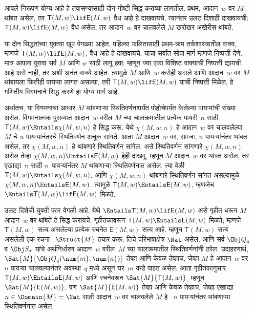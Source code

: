 \begin{explain}
आपले निरूपण योग्य आहे हे तपासण्यासाठी दोन
गोष्टी सिद्ध कराव्या लागतील. प्रथम,
आदान~$w$ वर $M$ थांबत असेल, तर
$\mathsf{T}(M, w) \lif \mathsf{E}(M, w)$ वैध आहे
हे दाखवायचे. त्यानंतर उलट दिशाही
दाखवायची: $\mathsf{T}(M, w) \lif \mathsf{E}(M, w)$
वैध असेल, तर आदान~$w$ वर
चालवलेले $M$ खरोखर अखेरीस
थांबते.

या दोन सिद्धतांच्या युक्त्या खूप
वेगळ्या आहेत. पहिल्या फलितासाठी
प्रथम-क्रम तर्कशास्त्रातील
वाक्य, म्हणजे
$\mathsf{T}(M, w) \lif \mathsf{E}(M, w)$,
वैध आहे हे दाखवायचे. याचा
सर्वांत सोपा मार्ग म्हणजे
निष्पत्ती देणे.
मात्र आपला पुरावा सर्व $M$
आणि $w$ साठी लागू हवा;
म्हणून ज्या एका विशिष्ट
वाक्याची
निष्पत्ती
द्यायची आहे असे नाही,
तर अशी अनंत वाक्ये आहेत.
त्यामुळे $M$ आणि~$w$
कसेही असले आणि आदान~$w$
वर $M$ थांबायला कितीही
पायऱ्या लागत असल्या,
तरी $\mathsf{T}(M, w) \lif \mathsf{E}(M, w)$
याची निष्पत्ती
मिळेल, हे गणितीय विगमनाने
सिद्ध करणे हा योग्य मार्ग आहे.

अर्थातच, या विगमनाचा आधार
$M$ थांबणाऱ्या स्थितिवर्णनापर्यंत
पोहोचेपर्यंत केलेल्या पायऱ्यांची
संख्या असेल. विगमनात्मक पुराव्यात
आदान~$w$ वरील $M$ च्या
चालक्रमातील प्रत्येक पायरी~$n$
साठी $\mathsf{T}(M, w) \Entails \chi(M, w, n)$
हे सिद्ध करू. येथे $\chi(M, w, n)$
हे आदान~$w$ वर चालवलेल्या~$M$
चे $n$ पायऱ्यांनंतरचे स्थितिवर्णन
अचूक सांगते. आता $M$ आदान~$w$
वर, समजा, $n$ पायऱ्यांनंतर
थांबत असेल, तर $\chi(M, w, n)$
हे थांबणारे स्थितिवर्णन सांगेल.
असे स्थितिवर्णन सांगणारे
$\chi(M, w, n)$ असेल तेव्हा
$\chi(M, w, n) \Entails \mathsf{E}(M, w)$
हेही दाखवू. म्हणून $M$
आदान~$w$ वर थांबत असेल,
तर एखाद्या~$n$ साठी
$n$~पायऱ्यांनंतर $M$
थांबणाऱ्या स्थितिवर्णनात असेल.
त्या वेळी $\mathsf{T}(M, w)
\Entails \chi(M, w, n)$,
आणि $\chi(M, w, n)$
थांबणारे स्थितिवर्णन सांगत
असल्यामुळे $\chi(M, w, n) \Entails \mathsf{E}(M, w)$.
त्यामुळे $\mathsf{T}(M, w) \Entails \mathsf{E}(M, w)$,
म्हणजेच $\Entails \mathsf{T}(M, w)
\lif \mathsf{E}(M, w)$ मिळते.

उलट दिशेची युक्ती फार वेगळी
आहे. येथे $\Entails \mathsf{T}(M, w) \lif \mathsf{E}(M, w)$
असे गृहीत धरून $M$ आदान~$w$
वर थांबते हे सिद्ध करायचे.
गृहीतकावरून $\mathsf{T}(M, w) \Entails \mathsf{E}(M,
w)$ मिळते; म्हणजे $\mathsf{T}(M,
w)$ सत्य असलेल्या प्रत्येक
रचनेत
$\mathsf{E}(M, w)$ सत्य आहे.
म्हणून $\mathsf{T}(M, w)$ सत्य
असलेली एक रचना
~$\Struct{M}$ तयार करू:
तिचे परिभाषाक्षेत्र $\Nat$
असेल, आणि सर्व $\Obj Q_q$
व $\Obj S_\sigma$ यांचे
अर्थनिर्धारण आदान~$w$
वरील~$M$ च्या चालक्रमातील
स्थितिवर्णनांनी ठरेल.
उदाहरणार्थ,
$\Sat{M}{\Obj Q_q(\num{m}, \num{n})}$
तेव्हा आणि केवळ तेव्हाच, जेव्हा $M$ हे
आदान~$w$ वर $n$ पायऱ्या
चालवल्यानंतर अवस्था~$q$
मध्ये असून घर~$m$ कडे
पाहत असेल. आता गृहीतकानुसार
$\mathsf{T}(M, w) \Entails \mathsf{E}(M, w)$
आणि रचनेवरून
$\Sat{M}{\mathsf{T}(M,
  w)}$, म्हणून
$\Sat{M}{\mathsf{E}(M, w)}$.
पण $\Sat{M}{\mathsf{E}(M, w)}$
तेव्हा आणि केवळ तेव्हाच, जेव्हा एखाद्या
$n \in \Domain{M} = \Nat$
साठी आदान~$w$ वर
चालवलेले $M$ हे
~$n$ पायऱ्यांनंतर
थांबणाऱ्या स्थितिवर्णनात
असेल.

\end{explain}


